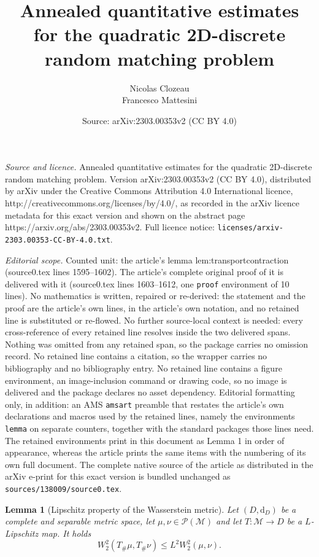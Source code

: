 \documentclass[10pt,a4paper]{amsart}
\title{Annealed quantitative estimates for the quadratic 2D-discrete random matching problem}
\author{Nicolas Clozeau \address[Nicolas Clozeau]{IST Austria, Austria} \hspace*{0.5cm} Francesco Mattesini \address[Francesco Mattesini]{Universit\"at M\"unster \& MPI Leipzig, Germany}}
\date{Source: arXiv:2303.00353v2 (CC BY 4.0)}
\newtheorem{lemma}{Lemma}
\newcommand{\dd}{\mathrm{d}}
\begin{document}
\maketitle

\noindent\emph{Source and licence.} Annealed quantitative estimates for the quadratic 2D-discrete random matching problem. Version arXiv:2303.00353v2 (CC BY 4.0), distributed by arXiv under the Creative Commons Attribution 4.0 International licence, http://creativecommons.org/licenses/by/4.0/, as recorded in the arXiv licence metadata for this exact version and shown on the abstract page https://arxiv.org/abs/2303.00353v2. Full licence notice: \texttt{licenses/arxiv-2303.00353-CC-BY-4.0.txt}.\par\smallskip

\noindent\textit{Editorial scope.} Counted unit: the article's lemma lem:transportcontraction (source0.tex lines 1595--1602). The article's complete original proof of it is delivered with it (source0.tex lines 1603--1612, one \texttt{proof} environment of 10 lines). No mathematics is written, repaired or re-derived: the statement and the proof are the article's own lines, in the article's own notation, and no retained line is substituted or re-flowed.  No further source-local context is needed: every cross-reference of every retained line resolves inside the two delivered spans.  Nothing was omitted from any retained span, so the package carries no omission record.  No retained line contains a citation, so the wrapper carries no bibliography and no bibliography entry.  No retained line contains a figure environment, an image-inclusion command or drawing code, so no image is delivered and the package declares no asset dependency.  Editorial formatting only, in addition: an AMS \texttt{amsart} preamble that restates the article's own declarations and macros used by the retained lines, namely the environments \texttt{lemma} on separate counters, together with the standard packages those lines need.  The retained environments print in this document as Lemma 1 in order of appearance, whereas the article prints the same items with the numbering of its own full document.  The complete native source of the article as distributed in the arXiv e-print for this exact version is bundled unchanged as \texttt{sources/138009/source0.tex}.
\begin{lemma}[Lipschitz property of the Wasserstein metric] \label{lem:transportcontraction}
Let $(D, \dd_D)$ be a complete and separable metric space, let $\mu, \nu\in\mathcal{P}(\mathcal{M})$ and let $T: \mathcal{M} \rightarrow D$ be a $L$-Lipschitz map. It holds
%
\begin{equation}\label{Eq:LipEstimateWasser}
W_2^2 (T_{\#}\mu,T_{\#} \nu) \le L^2 W_2^2 (\mu, \nu).
\end{equation}
%
\end{lemma}
\end{document}
